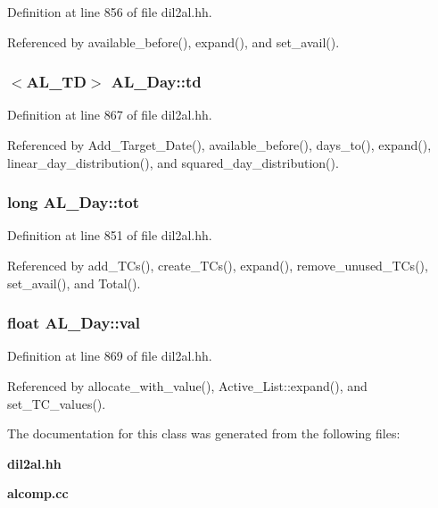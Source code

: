 Definition at line 856 of file dil2al.hh.

Referenced by available\_\-before(), expand(), and set\_\-avail().
\subsubsection{$<${\bf AL\_\-TD}$>$ AL\_\-Day::td}\label{classAL__Day_m1}




Definition at line 867 of file dil2al.hh.

Referenced by Add\_\-Target\_\-Date(), available\_\-before(), days\_\-to(), expand(), linear\_\-day\_\-distribution(), and squared\_\-day\_\-distribution().
\subsubsection{\setlength{\rightskip}{0pt plus 5cm}long AL\_\-Day::tot\hspace{0.3cm}{\tt  [protected]}}\label{classAL__Day_n2}




Definition at line 851 of file dil2al.hh.

Referenced by add\_\-TCs(), create\_\-TCs(), expand(), remove\_\-unused\_\-TCs(), set\_\-avail(), and Total().
\subsubsection{\setlength{\rightskip}{0pt plus 5cm}float AL\_\-Day::val}\label{classAL__Day_m2}




Definition at line 869 of file dil2al.hh.

Referenced by allocate\_\-with\_\-value(), Active\_\-List::expand(), and set\_\-TC\_\-values().

The documentation for this class was generated from the following files:\begin{CompactItemize}
\item 
{\bf dil2al.hh}\item 
{\bf alcomp.cc}\end{CompactItemize}
